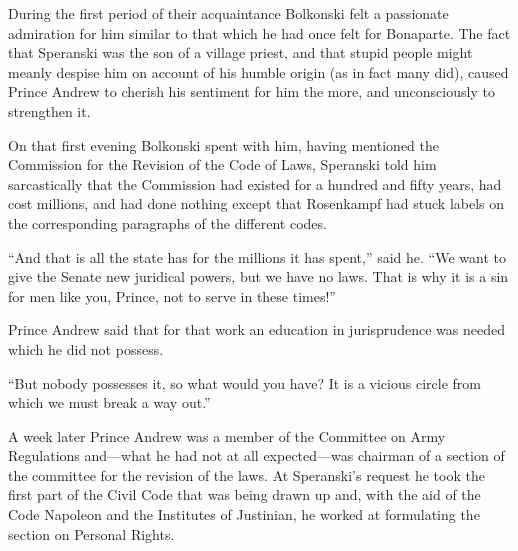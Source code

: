 During the first period of their acquaintance Bolkonski felt a
passionate admiration for him similar to that which he had once
felt for Bonaparte. The fact that Speranski was the son of a
village priest, and that stupid people might meanly despise him
on account of his humble origin (as in fact many did), caused
Prince Andrew to cherish his sentiment for him the more, and
unconsciously to strengthen it.

On that first evening Bolkonski spent with him, having mentioned
the Commission for the Revision of the Code of Laws, Speranski
told him sarcastically that the Commission had existed for a
hundred and fifty years, had cost millions, and had done nothing
except that Rosenkampf had stuck labels on the corresponding
paragraphs of the different codes.

``And that is all the state has for the millions it has spent,''
said he.  ``We want to give the Senate new juridical powers, but
we have no laws.  That is why it is a sin for men like you,
Prince, not to serve in these times!''

Prince Andrew said that for that work an education in
jurisprudence was needed which he did not possess.

``But nobody possesses it, so what would you have? It is a
vicious circle from which we must break a way out.''

A week later Prince Andrew was a member of the Committee on Army
Regulations and---what he had not at all expected---was chairman
of a section of the committee for the revision of the laws. At
Speranski's request he took the first part of the Civil Code that
was being drawn up and, with the aid of the Code Napoleon and the
Institutes of Justinian, he worked at formulating the section on
Personal Rights.


